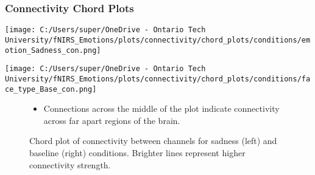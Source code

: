 \documentclass{beamer}
\begin{document}
\begin{frame}
    \frametitle{Connectivity Chord Plots}
    \begin{minipage}[t]{0.45\textwidth}
        \vspace{-\baselineskip}
        \texttt{[image: C:/Users/super/OneDrive - Ontario Tech University/fNIRS\_Emotions/plots/connectivity/chord\_plots/conditions/emotion\_Sadness\_con.png]}
    \end{minipage}
    \begin{minipage}[t]{0.45\textwidth}
        \vspace{-\baselineskip}
        \texttt{[image: C:/Users/super/OneDrive - Ontario Tech University/fNIRS\_Emotions/plots/connectivity/chord\_plots/conditions/face\_type\_Base\_con.png]}
    \end{minipage}
    \begin{figure}
        \caption{Chord plot of connectivity between channels for sadness (left) and baseline (right) conditions. Brighter lines represent higher connectivity strength.}
        \begin{itemize}
            \item Connections across the middle of the plot indicate connectivity across far apart regions of the brain.
        \end{itemize}
    \end{figure}
\end{frame}
\end{document}
